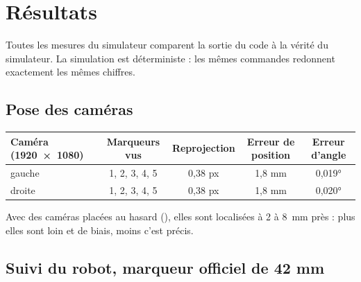 \documentclass[11pt,a4paper]{article}
\newcommand{\code}[1]{\texttt{\detokenize{#1}}}
\begin{document}
\section{Résultats}
\label{sec:resultats}

Toutes les mesures du simulateur comparent la sortie du code à la vérité du simulateur. La simulation est
déterministe : les mêmes commandes redonnent exactement les mêmes chiffres.

\subsection{Pose des caméras}

\begin{center}
\begin{tabular}{lcccc}
\toprule
Caméra (1920~×~1080) & Marqueurs vus & Reprojection & Erreur de position & Erreur d'angle \\
\midrule
gauche & 1, 2, 3, 4, 5 & 0,38 px & 1,8 mm & 0,019° \\
droite & 1, 2, 3, 4, 5 & 0,38 px & 1,8 mm & 0,020° \\
\bottomrule
\end{tabular}
\end{center}
Avec des caméras placées au hasard (\code{--shuffle}), elles sont localisées à 2 à 8~mm près : plus elles sont
loin et de biais, moins c'est précis.

\subsection{Suivi du robot, marqueur officiel de 42 mm}
\end{document}
